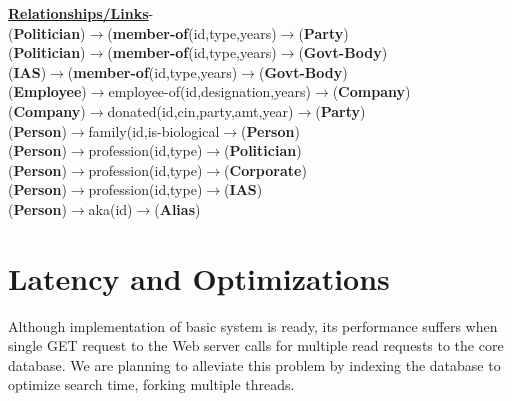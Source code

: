 \underline{\textbf{Relationships/Links}}-\\
(\textbf{Politician})$\rightarrow$(\textbf{member-of}(id,type,years)$\rightarrow$(\textbf{Party})\\
(\textbf{Politician})$\rightarrow$(\textbf{member-of}(id,type,years)$\rightarrow$(\textbf{Govt-Body})\\
(\textbf{IAS})$\rightarrow$(\textbf{member-of}(id,type,years)$\rightarrow$(\textbf{Govt-Body})\\
(\textbf{Employee})$\rightarrow${employee-of}(id,designation,years)$\rightarrow$(\textbf{Company})\\
(\textbf{Company})$\rightarrow${donated}(id,cin,party,amt,year)$\rightarrow$(\textbf{Party})\\
(\textbf{Person})$\rightarrow${family}(id,is-biological$\rightarrow$(\textbf{Person})\\
(\textbf{Person})$\rightarrow${profession}(id,type)$\rightarrow$(\textbf{Politician})\\
(\textbf{Person})$\rightarrow${profession}(id,type)$\rightarrow$(\textbf{Corporate})\\
(\textbf{Person})$\rightarrow${profession}(id,type)$\rightarrow$(\textbf{IAS})\\
(\textbf{Person})$\rightarrow${aka}(id)$\rightarrow$(\textbf{Alias})\\

\section{Latency and Optimizations}
Although implementation of basic system is ready, its performance suffers when single GET request to the Web server calls for multiple read requests to the core database. We are planning to alleviate this problem by indexing the database to optimize search time, forking multiple threads.
